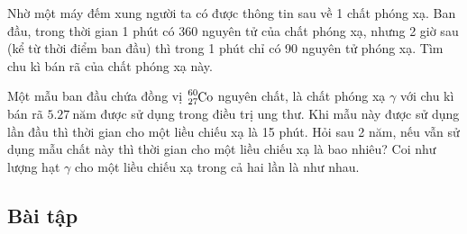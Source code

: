 \begin{vd}
	Nhờ một máy đếm xung người ta có được thông tin sau về 1 chất phóng xạ. Ban đầu, trong thời gian 1 phút có 360 nguyên tử của chất phóng xạ, nhưng 2 giờ sau (kể từ thời điểm ban đầu) thì trong 1 phút chỉ có 90 nguyên tử phóng xạ. Tìm chu kì bán rã của chất phóng xạ này.
\end{vd}
\begin{vd}
Một mẫu ban đầu chứa đồng vị $\ce{^{60}_{27}Co}$ nguyên chất, là chất phóng xạ $\gamma$ với chu kì bán rã $\SI{5.27}{\text{năm}}$ được sử dụng trong điều trị ung thư. Khi mẫu này được sử dụng lần đầu thì thời gian cho một liều chiếu xạ là 15 phút. Hỏi sau 2 năm, nếu vẫn sử dụng mẫu chất này thì thời gian cho một liều chiếu xạ là bao nhiêu? Coi như lượng hạt $\gamma$ cho một liều chiếu xạ trong cả hai lần là như nhau.
\end{vd}
\subsection{Bài tập}
